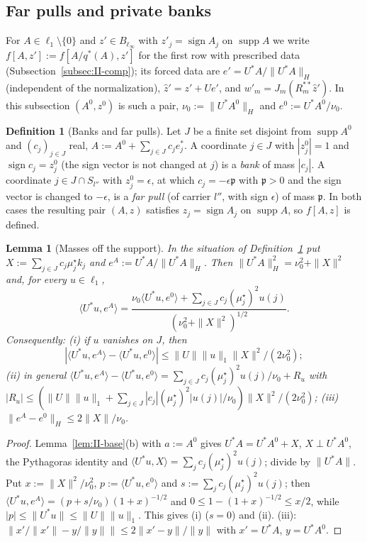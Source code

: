 \documentclass[10pt]{amsart}
\newtheorem{lemma}[theorem]{Lemma}
\theoremstyle{definition}
\newtheorem{definition}[theorem]{Definition}
\theoremstyle{remark}
\newcommand{\supp}{\operatorname{supp}}
\newcommand{\sgn}{\operatorname{sign}}
\newcommand{\zh}{\hat z}
\newcommand{\ip}[2]{\langle #1,#2\rangle}
\begin{document}
\subsection{Far pulls and private banks}\label{subsec:II-tools}

For $A\in\ell_1\setminus\{0\}$ and $z'\in B_{\ell_\infty}$ with $z'_j=\sgn A_j$
on $\supp A$ we write $f[A,z']:=f[A/q^*(A),z']$ for the first row with
prescribed data (Subsection~\ref{subsec:II-comp}); its forced data are
$e'=U^*A/\|U^*A\|_H$ (independent of the normalization), $\zh'=z'+Ue'$, and
$w'_m=J_m(R_m^{**}\zh')$.  In this subsection $(A^0,z^0)$ is such a pair,
$\nu_0:=\|U^*A^0\|_H$ and $e^0:=U^*A^0/\nu_0$.

\begin{definition}[Banks and far pulls]\label{def:II-bankpull}
Let $J$ be a finite set disjoint from $\supp A^0$ and $(c_j)_{j\in J}$ real,
$A:=A^0+\sum_{j\in J}c_je^*_j$.  A coordinate $j\in J$ with $|z^0_j|=1$ and
$\sgn c_j=z^0_j$ (the sign vector is not changed at $j$) is a \emph{bank} of
mass $|c_j|$.  A coordinate $j\in J\cap S_{l''}$ with $z^0_j=\epsilon$, at
which $c_j=-\epsilon\mathfrak p$ with $\mathfrak p>0$ and the sign vector is
changed to $-\epsilon$, is a \emph{far pull} (of carrier $l''$, with sign
$\epsilon$) of mass $\mathfrak p$.  In both cases the resulting pair $(A,z)$
satisfies $z_j=\sgn A_j$ on $\supp A$, so $f[A,z]$ is defined.
\end{definition}

\begin{lemma}[Masses off the support]\label{lem:II-bankformula}
In the situation of Definition~\textup{\ref{def:II-bankpull}} put
$X:=\sum_{j\in J}c_j\mu^\star_jk_j$ and $e^A:=U^*A/\|U^*A\|_H$.  Then
$\|U^*A\|_H^2=\nu_0^2+\|X\|^2$ and, for every $u\in\ell_1$,
\begin{equation}\label{eq:II-bankformula}
 \ip{U^*u}{e^A}=\frac{\nu_0\ip{U^*u}{e^0}+\sum_{j\in J}c_j(\mu^\star_j)^2
 u(j)}{(\nu_0^2+\|X\|^2)^{1/2}} .
\end{equation}
Consequently:
\textup{(i)} if $u$ vanishes on $J$, then
\[
 |\ip{U^*u}{e^A}-\ip{U^*u}{e^0}|\le\|U\|\|u\|_1\|X\|^2/(2\nu_0^2);
\]
\textup{(ii)} in general $\ip{U^*u}{e^A}-\ip{U^*u}{e^0}=\sum_{j\in J}c_j
(\mu^\star_j)^2u(j)/\nu_0+R_u$ with $|R_u|\le(\|U\|\|u\|_1+\sum_{j\in J}
|c_j|(\mu^\star_j)^2|u(j)|/\nu_0)\|X\|^2/(2\nu_0^2)$;
\textup{(iii)} $\|e^A-e^0\|_H\le2\|X\|/\nu_0$.
\end{lemma}

\begin{proof}
Lemma~\ref{lem:II-base}(b) with $a:=A^0$ gives $U^*A=U^*A^0+X$, $X\perp
U^*A^0$, the Pythagoras identity and $\ip{U^*u}{X}=\sum_jc_j(\mu^\star_j)^2
u(j)$; divide by $\|U^*A\|$.  Put $x:=\|X\|^2/\nu_0^2$, $p:=\ip{U^*u}{e^0}$
and $s:=\sum_jc_j(\mu^\star_j)^2u(j)$; then $\ip{U^*u}{e^A}=(p+s/\nu_0)
(1+x)^{-1/2}$ and $0\le1-(1+x)^{-1/2}\le x/2$, while $|p|\le\|U^*u\|\le
\|U\|\|u\|_1$.  This gives (i) ($s=0$) and (ii).  (iii):
$\|x'/\|x'\|-y/\|y\|\|\le2\|x'-y\|/\|y\|$ with $x'=U^*A$, $y=U^*A^0$.
\end{proof}
\end{document}
